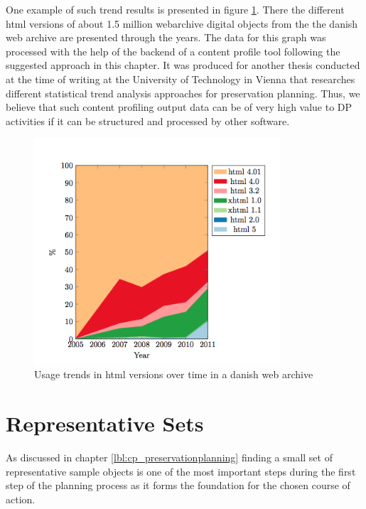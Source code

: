 One example of such trend results is presented in figure \ref{fig:trends_html}. There the different html versions of about 1.5 million webarchive digital objects from the the danish web archive are presented through the years. The data for this graph was processed with the help of the backend of a content profile tool following the suggested approach in this chapter. It was produced for another thesis conducted at the time of writing at the University of Technology in Vienna that researches different statistical trend analysis approaches for preservation planning. Thus, we believe that such content profiling output data can be of very high value to DP activities if it can be structured and processed by other software.


\begin{figure}[t]
\begin{center}
\includegraphics[width=3.6in]{figures/contentprofiling/trends_html.png}
\caption{Usage trends in html versions over time in a danish web archive}
\label{fig:trends_html}
\end{center}
\end{figure}

\section{Representative Sets}
\label{sec:representative_sets}
As discussed in chapter \ref{lbl:cp_preservationplanning} finding a small set of representative sample objects is one of the most important steps during the first step of the planning process as it forms the foundation for the chosen course of action.


